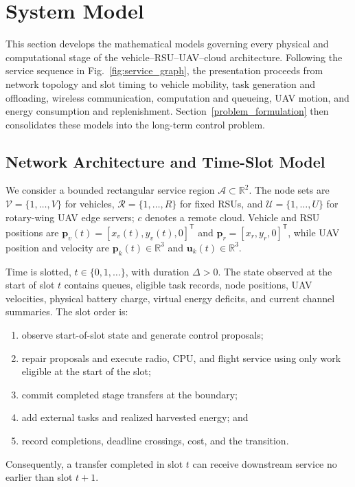 \documentclass[journal]{IEEEtran}
\begin{document}
\section{System Model}
\label{system_model}

This section develops the mathematical models governing every physical and
computational stage of the vehicle--RSU--UAV--cloud architecture.  Following
the service sequence in Fig.~\ref{fig:service_graph}, the presentation proceeds
from network topology and slot timing to vehicle mobility, task generation and
offloading, wireless communication, computation and queueing, UAV motion, and
energy consumption and replenishment.  Section~\ref{problem_formulation} then
consolidates these models into the long-term control problem.

\subsection{Network Architecture and Time-Slot Model}
\label{subsec:network_model}
We consider a bounded rectangular service region
$\mathcal A\subset\mathbb R^2$.  The node sets are
$\mathcal V=\{1,\ldots,V\}$ for vehicles,
$\mathcal R=\{1,\ldots,R\}$ for fixed RSUs, and
$\mathcal U=\{1,\ldots,U\}$ for rotary-wing UAV edge servers;
$c$ denotes a remote cloud.  Vehicle and RSU positions are
$\boldsymbol p_v(t)=[x_v(t),y_v(t),0]^{\mathsf T}$ and
$\boldsymbol p_r=[x_r,y_r,0]^{\mathsf T}$, while UAV position and
velocity are $\boldsymbol p_k(t)\in\mathbb R^3$ and
$\boldsymbol u_k(t)\in\mathbb R^3$.

Time is slotted, $t\in\{0,1,\ldots\}$, with duration $\Delta>0$.
The state observed at the start of slot $t$ contains queues, eligible
task records, node positions, UAV velocities, physical battery charge,
virtual energy deficits, and current channel summaries.  The slot
order is:
\begin{enumerate}
\item observe start-of-slot state and generate control proposals;
\item repair proposals and execute radio, CPU, and flight service using
only work eligible at the start of the slot;
\item commit completed stage transfers at the boundary;
\item add external tasks and realized harvested energy; and
\item record completions, deadline crossings, cost, and the transition.
\end{enumerate}
Consequently, a transfer completed in slot $t$ can receive downstream
service no earlier than slot $t+1$.
\end{document}

